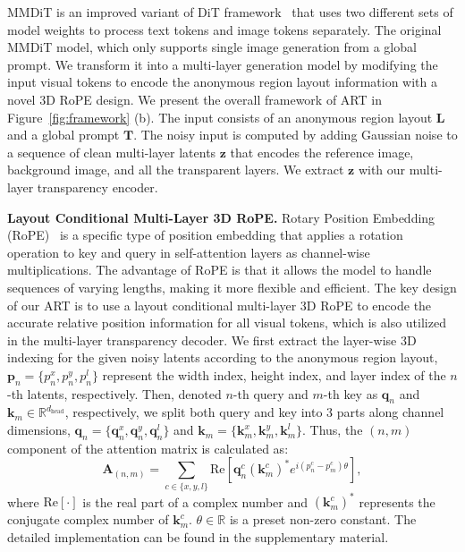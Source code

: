 MMDiT is an improved variant of DiT framework~\cite{esser2024scaling} that uses two different sets of model weights to process text tokens and image tokens separately. 
The original MMDiT model, which only supports single image generation from a global prompt.
We transform it into a multi-layer generation model by modifying the input visual tokens to encode the anonymous region layout information with a novel 3D RoPE design.
We present the overall framework of ART in Figure~\ref{fig:framework} (b).
The input consists of an anonymous region layout $\mathbf{L}$ and a global prompt $\mathbf{T}$. The noisy input is computed by adding Gaussian noise to a sequence of clean multi-layer latents $\mathbf{z}$ that encodes the reference image, background image, and all the transparent layers. We extract $\mathbf{z}$ with our multi-layer transparency encoder.

\vspace{1mm}
\noindent\textbf{Layout Conditional Multi-Layer 3D RoPE.}
Rotary Position Embedding (RoPE)~\cite{su2024roformer} is a specific type of position embedding that applies a rotation operation to key and query in self-attention layers as channel-wise multiplications. The advantage of RoPE is that it allows the model to handle sequences of varying lengths, making it more flexible and efficient. The key design of our ART is to use a layout conditional multi-layer 3D RoPE to encode the accurate relative position information for all visual tokens, which is also utilized in the multi-layer transparency decoder.
We first extract the layer-wise 3D indexing for the given noisy latents according to the anonymous region layout, \ie $\mathbf{p}_n=\{p_n^x, p_n^y, p_n^l\}$ represent the width index, height index, and layer index of the $n$-th latents, respectively. Then, denoted $n$-th query and $m$-th key as $\mathbf{q}_n$ and $\mathbf{k}_m \in \mathbb{R}^{d_{\text{head}}}$, respectively, we split both query and key into 3 parts along channel dimensions, \ie $\mathbf{q}_n=\{\mathbf{q}_n^x, \mathbf{q}_n^y, \mathbf{q}_n^l\}$ and $\mathbf{k}_m=\{\mathbf{k}_m^x, \mathbf{k}_m^y, \mathbf{k}_m^l\}$. Thus, the $(n, m)$ component of the attention matrix is calculated as:
\begin{equation}
	\mathbf{A}_{(n, m)} = \sum_{c\in \{x, y, l\}}{\text{Re}[\mathbf{q}_n^c{(\mathbf{k}_m^c)}^* e^{i(p_n^c-p_m^c)\theta}]},
\end{equation}
where $\text{Re}[\cdot]$ is the real part of a complex number and $(\mathbf{k}_m^c)^*$ represents the conjugate complex number of $\mathbf{k}_m^c$. $\theta \in \mathbb{R}$ is a preset non-zero constant. The detailed implementation can be found in the supplementary material.

